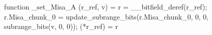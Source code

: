 function _set_Misa_A (r_ref, v) = {
    r = __bitfield_deref(r_ref);
    r.Misa_chunk_0 = update_subrange_bits(r.Misa_chunk_0, 0, 0, subrange_bits(v, 0, 0));
    (*r_ref) = r
}

